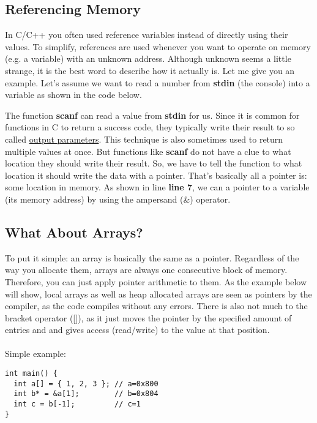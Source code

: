 \documentclass{article}
\begin{document}
  \subsection{Referencing Memory}
  In C/C++ you often used reference variables instead of directly using their values.
  To simplify, references are used whenever you want to operate on memory (e.g. a variable) with an unknown address.
  Although unknown seems a little strange, it is the best word to describe how it actually is.
  Let me give you an example.
  Let's assume we want to read a number from \textbf{stdin} (the console) into a variable as shown in the code below.
  
  The function \textbf{scanf} can read a value from \textbf{stdin} for us.
  Since it is common for functions in C to return a success code, they typically write their result to so called \underline{output parameters}.
  This technique is also sometimes used to return multiple values at once.
  But functions like \textbf{scanf} do not have a clue to what location they should write their result.
  So, we have to tell the function to what location it should write the data with a pointer.
  That's basically all a pointer is: some location in memory.
  As shown in line \textbf{line 7}, we can a pointer to a variable (its memory address) by using the ampersand (\&) operator.
  \subsection{What About Arrays?}
  To put it simple: an array is basically the same as a pointer.
  Regardless of the way you allocate them, arrays are always one consecutive block of memory.
  Therefore, you can just apply pointer arithmetic to them.
  As the example below will show, local arrays as well as heap allocated arrays are seen as pointers by the compiler, as the code compiles without any errors.
  There is also not much to the bracket operator ([]), as it just moves the pointer by the specified amount of entries and and gives access (read/write) to the value at that position.
  \\\\Simple example:
  \begin{lstlisting}
int main() {
  int a[] = { 1, 2, 3 }; // a=0x800
  int b* = &a[1];        // b=0x804
  int c = b[-1];         // c=1
}
  \end{lstlisting}
  \newpage
  
\end{document}
